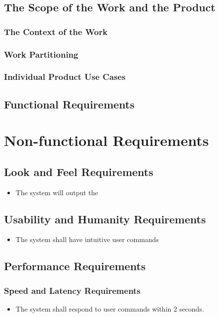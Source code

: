 \documentclass[12pt, titlepage]{article}
\begin{document}
\subsection{The Scope of the Work and the Product}

\subsubsection{The Context of the Work}

\subsubsection{Work Partitioning}

\subsubsection{Individual Product Use Cases}

\subsection{Functional Requirements}

\section{Non-functional Requirements}

\subsection{Look and Feel Requirements}
\begin{itemize}
    \item The system will output the 
\end{itemize}

\subsection{Usability and Humanity Requirements}
\begin{itemize}
    \item The system shall have intuitive user commands
\end{itemize}

\subsection{Performance Requirements}
\subsubsection{Speed and Latency Requirements}
\begin{itemize}
    \item The system shall respond to user commands within 2 seconds.
\end{itemize}
\end{document}
